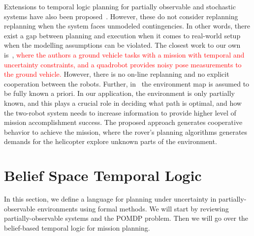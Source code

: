 \documentclass[conference]{IEEEtran}
\newcommand{\cristi}[1]{{\color{orange} [Cristi] #1}}
\begin{document}
	
	
	
	
	Extensions to temporal logic planning for partially observable and stochastic systems have also been
	proposed~\cite{Cristi-CDC-2016,dorsa-rss2016,fu2015integrating}.
	However, these do not consider replanning replanning when the system faces unmodeled contingencies.
	In other words, there exist a gap between planning and execution when it comes to real-world setup
	when the modelling assumptions can be violated.
	The closest work to our own is~\cite{Cristi-CDC-2016}, \textcolor{red}{where the authors a ground vehicle tasks with
	a mission with temporal and uncertainty constraints, and a quadrobot provides noisy pose measurements
	to the ground vehicle.}
	However, there is no on-line replanning and no explicit cooperation between the robots.
	Further, in~\cite{Cristi-CDC-2016} the environment map is assumed to be fully known a priori.
	In our application, the environment is only partially known, and this plays a crucial role in
	deciding what path is optimal, and how the two-robot system needs to increase information to
	provide higher level of mission accomplishment success.
	The proposed approach generates cooperative behavior to achieve the mission, where the rover's planning
	algorithms generates demands for the helicopter explore unknown parts of the environment.
	
	\section{Belief Space Temporal Logic}
	\label{sec:POMDP}
	In this section, we define a language for planning under uncertainty in partially-observable environments using formal methods. We will start by reviewing partially-observable systems and the POMDP problem. Then we will go over the belief-based temporal logic for mission planning.
	
\end{document}
